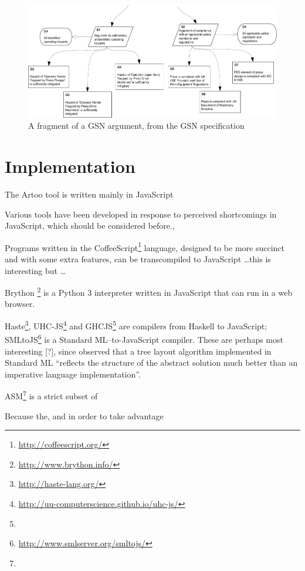 \begin{figure}
    \includegraphics[width=\textwidth]{graphics/unaligned_siblings.pdf}
    \caption{A fragment of a GSN argument,
            from the GSN specification \citep[figure~42, section~2.3.6.5, pp.~34]{gsnstandard}}
    \label{fig:unalignedsiblings}
\end{figure}








\section{Implementation}

The Artoo tool is written mainly in JavaScript 

Various tools have been developed in response to perceived shortcomings in JavaScript, which should be considered before., 

Programs written in the CoffeeScript\footnote{\url{http://coffeescript.org/}} language, designed to be more succinct and with some extra features, can be transcompiled to JavaScript \ldots this is interesting but \ldots

Brython \footnote{\url{http://www.brython.info/}} is a Python 3 interpreter written in JavaScript that can run in a web browser. 

Haste\footnote{\url{http://haste-lang.org/}}, UHC-JS\footnote{\url{http://uu-computerscience.github.io/uhc-js/}}
and GHCJS\footnote{} are compilers from Haskell to JavaScript;
SMLtoJS\footnote{\url{http://www.smlserver.org/smltojs/}} is a Standard ML--to-JavaScript compiler.
These are perhaps most interesting [?], since \citet{kennedyfuntrees} observed that a tree layout algorithm implemented in Standard ML ``reflects the structure of the abstract solution much better than an imperative language implementation''.

ASM\footnote{} is a strict subset of 

Because the, and in order to take advantage



